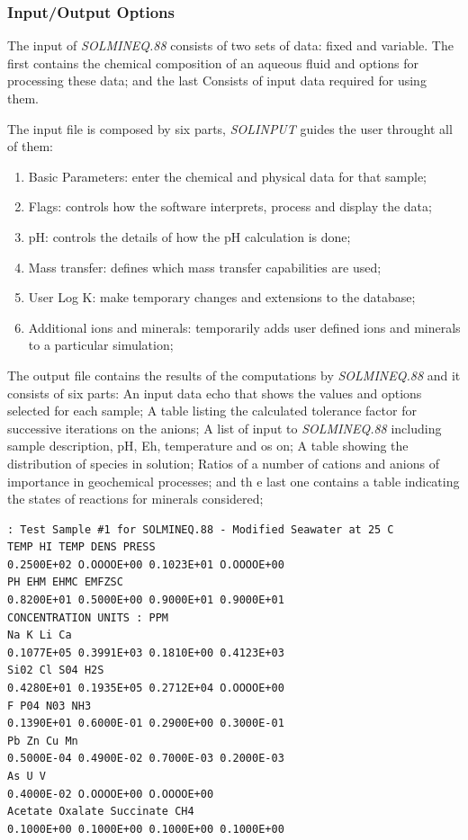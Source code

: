 \documentclass[ppgc,mestrado,english]{iiufrgs}
\begin{document}
\subsubsection{Input/Output Options}
The input of \emph{SOLMINEQ.88} consists of two sets of data: fixed and variable. The first contains the chemical composition of an aqueous fluid and options for processing these data; and the last Consists of input data required for using them.

The input file is composed by six parts, \emph{SOLINPUT} guides the user throught all of them:
\begin{enumerate}
\item Basic Parameters: enter the chemical and physical data for that sample;
\item Flags: controls how the software interprets, process and display the data;
\item pH: controls the details of how the pH calculation is done;
\item Mass transfer: defines which mass transfer capabilities are used;
\item User Log K: make temporary changes and extensions to the database;
\item Additional ions and minerals: temporarily adds user defined ions and minerals to a particular simulation;
\end{enumerate}

The output file contains the results of the computations by \emph{SOLMINEQ.88} and it consists of six parts: An input data echo that shows the values and options selected for each sample; A table listing the calculated tolerance factor for successive iterations on the anions; A list of input to \emph{SOLMINEQ.88} including sample description, pH, Eh, temperature and os on; A table showing the distribution of species in solution; Ratios of a number of cations and anions of importance in geochemical processes; and th
e last one contains a table indicating the states of reactions for minerals considered;

\begin{minipage}[c]{0.95\textwidth}
\begin{lstlisting}[frame=single, caption=\emph{SOLMINEQ.88}'s excerpt of the output file, label=solmineq:output]
 : Test Sample #1 for SOLMINEQ.88 - Modified Seawater at 25 C
TEMP HI TEMP DENS PRESS
0.2500E+02 O.OOOOE+00 0.1023E+01 O.OOOOE+00
PH EHM EHMC EMFZSC
0.8200E+01 0.5000E+00 0.9000E+01 0.9000E+01
CONCENTRATION UNITS : PPM
Na K Li Ca
0.1077E+05 0.3991E+03 0.1810E+00 0.4123E+03
Si02 Cl S04 H2S
0.4280E+01 0.1935E+05 0.2712E+04 O.OOOOE+00
F P04 N03 NH3
0.1390E+01 0.6000E-01 0.2900E+00 0.3000E-01
Pb Zn Cu Mn
0.5000E-04 0.4900E-02 0.7000E-03 0.2000E-03
As U V
0.4000E-02 O.OOOOE+00 O.OOOOE+00
Acetate Oxalate Succinate CH4
0.1000E+00 0.1000E+00 0.1000E+00 0.1000E+00
\end{lstlisting}
\end{minipage}
\end{document}
